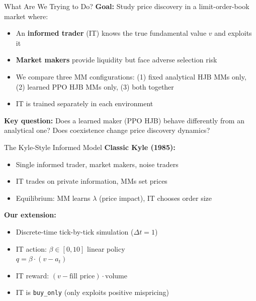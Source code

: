 \documentclass[10pt,aspectratio=169]{beamer}
\begin{document}
\begin{frame}{What Are We Trying to Do?}
  \textbf{Goal:} Study price discovery in a limit-order-book market where:
  \begin{itemize}
    \item An \textbf{informed trader} (IT) knows the true fundamental value $v$ and exploits it
    \item \textbf{Market makers} provide liquidity but face adverse selection risk
    \item We compare three MM configurations: (1) fixed analytical HJB MMs only,
          (2) learned PPO HJB MMs only, (3) both together
    \item IT is trained separately in each environment
  \end{itemize}

  \vspace{6pt}
  \textbf{Key question:} Does a learned maker (PPO HJB) behave differently from an analytical one?
  Does coexistence change price discovery dynamics?
\end{frame}

\begin{frame}{The Kyle-Style Informed Model}
  \textbf{Classic Kyle (1985):}
  \begin{itemize}
    \item Single informed trader, market makers, noise traders
    \item IT trades on private information, MMs set prices
    \item Equilibrium: MM learns $\lambda$ (price impact), IT chooses order size
  \end{itemize}

  \vspace{6pt}
  \textbf{Our extension:}
  \begin{itemize}
    \item Discrete-time tick-by-tick simulation ($\Delta t = 1$)
    \item IT action: $\beta \in [0,10]$ linear policy \\
          $q = \beta \cdot (v - a_t)$
    \item IT reward: $(v - \text{fill price}) \cdot \text{volume}$
    \item IT is \texttt{buy\_only} (only exploits positive mispricing)
  \end{itemize}
\end{frame}
\end{document}
